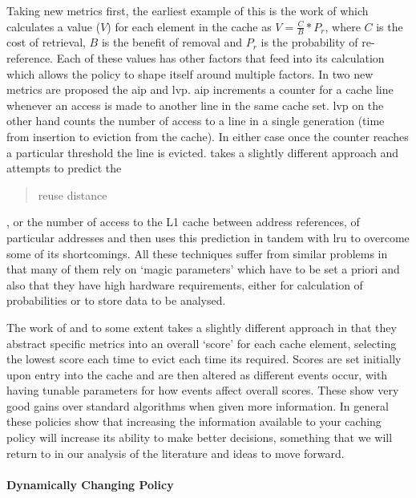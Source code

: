 Taking new metrics first, the earliest example of this is the work of  \citet{rizzoReplacementPoliciesProxy2000} which calculates a value ($V$) for each element in the cache as $V = \frac{C}{B}*P_r$, where $C$ is the cost of retrieval, $B$ is the benefit of removal and $P_r$ is the probability of re-reference. Each of these values has other factors that feed into its calculation which allows the policy to shape itself around multiple factors. In \citet{kharbutliCounterBasedCacheReplacement2005} two new metrics are proposed the \gls{aip} and \gls{lvp}. \gls{aip} increments a counter for a cache line whenever an access is made to another line in the same cache set. \gls{lvp} on the other hand counts the number of access to a line in a single generation (time from insertion to eviction from the cache). In either case once the counter reaches a particular threshold the line is evicted. \citet{keramidasCacheReplacementBased2007} takes a slightly different approach and attempts to predict the \blockcquote{keramidasCacheReplacementBased2007}{reuse distance}, or the number of access to the L1 cache between address references, of particular addresses and then uses this prediction in tandem with \gls{lru} to overcome some of its shortcomings. All these techniques suffer from similar problems in that many of them rely on `magic parameters' which have to be set a priori and also that they have high hardware requirements, either for calculation of probabilities or to store data to be analysed. 

The work of \citet{duongSCOREScoreBasedMemory2010} and to some extent \citet{tadaCacheReplacementPolicy2019} takes a slightly different approach in that they abstract specific metrics into an overall `score' for each cache element, selecting the lowest score each time to evict each time its required. Scores are set initially upon entry into the cache and are then altered as different events occur, with \citet{duongSCOREScoreBasedMemory2010} having tunable parameters for how events affect overall scores. These show very good gains over standard algorithms when given more information. In general these policies show that increasing the information available to your caching policy will increase its ability to make better decisions, something that we will return to in our analysis of the literature and ideas to move forward.

\paragraph{Dynamically Changing Policy}

